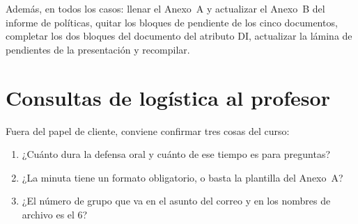 \documentclass[11pt,letterpaper]{article}
\newcommand{\numgrupo}{6}
\begin{document}
Además, en todos los casos: llenar el Anexo~A y actualizar el Anexo~B del informe de políticas, quitar
los bloques de pendiente de los cinco documentos, completar los dos bloques del documento del atributo
DI, actualizar la lámina de pendientes de la presentación y recompilar.

\section{Consultas de logística al profesor}

Fuera del papel de cliente, conviene confirmar tres cosas del curso:

\begin{enumerate}[itemsep=1pt]
\item ¿Cuánto dura la defensa oral y cuánto de ese tiempo es para preguntas?
\item ¿La minuta tiene un formato obligatorio, o basta la plantilla del Anexo~A?
\item ¿El número de grupo que va en el asunto del correo y en los nombres de archivo es el \numgrupo?
\end{enumerate}
\end{document}
